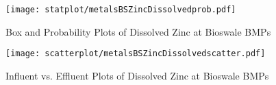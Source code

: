         \begin{figure}[hb]   %
            \centering
            \texttt{[image: statplot/metalsBSZincDissolvedprob.pdf]}
            \caption{Box and Probability Plots of Dissolved Zinc at Bioswale BMPs}
        \end{figure}         %
        
        
        \begin{figure}[hb]   %
            \centering
            \texttt{[image: scatterplot/metalsBSZincDissolvedscatter.pdf]}
            \caption{Influent vs. Effluent Plots of Dissolved Zinc at Bioswale BMPs}
        \end{figure}         %
        \clearpage
        